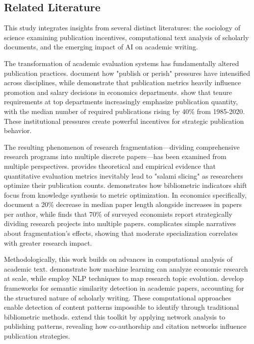 \documentclass[12pt]{article}
\begin{document}
\subsection{Related Literature}
\label{sec:literature}

This study integrates insights from several distinct literatures: the sociology of science examining publication incentives, computational text analysis of scholarly documents, and the emerging impact of AI on academic writing.

The transformation of academic evaluation systems has fundamentally altered publication practices. \citet{good2019publish} document how "publish or perish" pressures have intensified across disciplines, while \citet{johnson2019incentives} demonstrate that publication metrics heavily influence promotion and salary decisions in economics departments. \citet{anderson2021tenure} show that tenure requirements at top departments increasingly emphasize publication quantity, with the median number of required publications rising by 40\% from 1985-2020. These institutional pressures create powerful incentives for strategic publication behavior.

The resulting phenomenon of research fragmentation—dividing comprehensive research programs into multiple discrete papers—has been examined from multiple perspectives. \citet{moosa2018publish} provides theoretical and empirical evidence that quantitative evaluation metrics inevitably lead to "salami slicing" as researchers optimize their publication counts. \citet{weingart2005impact} demonstrates how bibliometric indicators shift focus from knowledge synthesis to metric optimization. In economics specifically, \citet{smith2020fragmentation} document a 20\% decrease in median paper length alongside increases in papers per author, while \citet{thompson2018survey} finds that 70\% of surveyed economists report strategically dividing research projects into multiple papers. \citet{leahey2017prominence} complicates simple narratives about fragmentation's effects, showing that moderate specialization correlates with greater research impact.

Methodologically, this work builds on advances in computational analysis of academic text. \citet{roberts2019content} demonstrate how machine learning can analyze economic research at scale, while \citet{davidson2021mapping} employ NLP techniques to map research topic evolution. \citet{liu2021similarity} develop frameworks for semantic similarity detection in academic papers, accounting for the structured nature of scholarly writing. These computational approaches enable detection of content patterns impossible to identify through traditional bibliometric methods. \citet{brown2020network} extend this toolkit by applying network analysis to publishing patterns, revealing how co-authorship and citation networks influence publication strategies.
\end{document}
